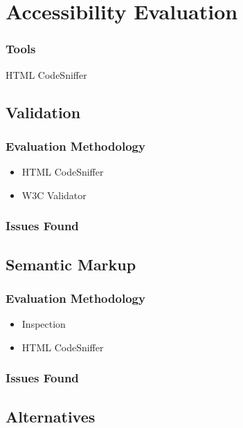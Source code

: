 \section{Accessibility Evaluation}

\subsubsection{Tools}

HTML CodeSniffer

\subsection{Validation}

\subsubsection{Evaluation Methodology}

\begin{itemize}
\item HTML CodeSniffer
\item W3C Validator
\end{itemize}

\subsubsection{Issues Found}

\subsection{Semantic Markup}

\subsubsection{Evaluation Methodology}

\begin{itemize}
\item Inspection
\item HTML CodeSniffer
\end{itemize}

\subsubsection{Issues Found}

\subsection{Alternatives}

